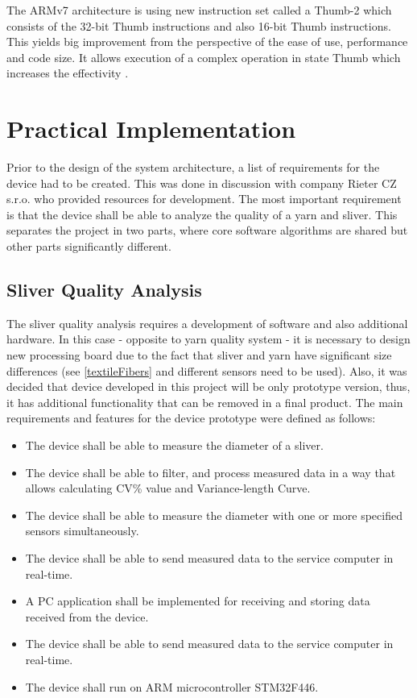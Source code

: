 \documentclass[twoside]{ctuthesis}
\theoremstyle{plain}
\theoremstyle{definition}
\theoremstyle{note}
\begin{document}
The ARMv7 architecture is using new instruction set called a Thumb-2 which consists of the 32-bit Thumb instructions and also 16-bit Thumb instructions. This yields big improvement from the perspective of the ease of use, performance and code size. It allows execution of a complex operation in state Thumb which increases the effectivity \cite{cite:ARM-M3}.

\chapter{Practical Implementation}
Prior to the design of the system architecture, a list of requirements for the device had to be created. This was done in discussion with company Rieter CZ s.r.o. who provided resources for development. The most important requirement is that the device shall be able to analyze the quality of a yarn and sliver. This separates the project in two parts, where core software algorithms are shared but other parts significantly different. 

\section{Sliver Quality Analysis}
The sliver quality analysis requires a development of software and also additional hardware. In this case - opposite to yarn quality system - it is necessary to design new processing board due to the fact that sliver and yarn have significant size differences (see \ref{textileFibers} and different sensors need to be used). Also, it was decided that device developed in this project will be only prototype version, thus, it has additional functionality that can be removed in a final product. The main requirements and features for the device prototype were defined as follows:
\begin{itemize}
	\setlength{\itemsep}{5pt}
	\item The device shall be able to measure the diameter of a sliver.
	\item The device shall be able to filter, and process measured data in a way that allows calculating CV\% value and Variance-length Curve.
	\item The device shall be able to measure the diameter with one or more specified sensors simultaneously.
	\item The device shall be able to send measured data to the service computer in real-time.
	\item A PC application shall be implemented for receiving and storing data received from the device.
	\item The device shall be able to send measured data to the service computer in real-time.
	\item The device shall run on ARM microcontroller STM32F446.
\end{itemize}
\end{document}
